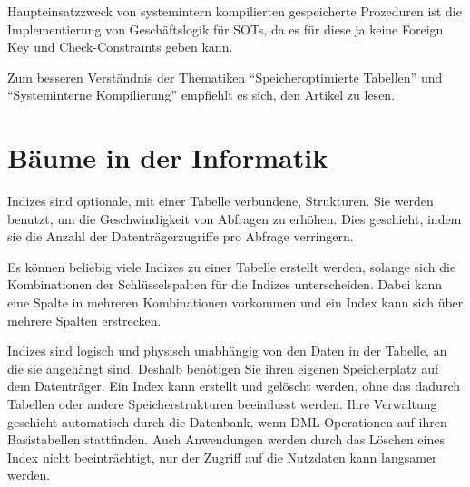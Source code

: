           Haupteinsatzzweck von systemintern kompilierten gespeicherte
          Prozeduren ist die Implementierung von Geschäftslogik für SOTs, da es
          für diese ja keine Foreign Key und Check-Constraints geben kann.
          \begin{merke}
            Zum besseren Verständnis der Thematiken \enquote{Speicheroptimierte
            Tabellen} und \enquote{Systeminterne Kompilierung} empfiehlt es
            sich, den Artikel \parencite{dn205319} zu lesen.
          \end{merke}
          \begin{literaturinternet}
            \item \cite{DynLinLib}
            \item \cite{KleKonSS2IMOAid}
            \item \cite{dn249342}
            \item \cite{dn205319}
          \end{literaturinternet}         
    \section{B\"aume in der Informatik}
      Indizes sind optionale, mit einer Tabelle verbundene, Strukturen.
      Sie werden benutzt, um die Geschwindigkeit von Abfragen zu erh\"ohen. Dies
      geschieht, indem sie die Anzahl der Datentr\"agerzugriffe pro Abfrage
      verringern.

      Es k\"onnen beliebig viele Indizes zu einer Tabelle erstellt werden,
      solange sich die Kombinationen der Schlüsselspalten f\"ur die Indizes
      unterscheiden. Dabei kann eine Spalte in mehreren Kombinationen vorkommen
      und ein Index kann sich \"uber mehrere Spalten erstrecken.

      Indizes sind logisch und physisch unabh\"angig von den Daten in der
      Tabelle, an die sie angeh\"angt sind. Deshalb ben\"otigen Sie ihren
      eigenen Speicherplatz auf dem Datentr\"ager. Ein Index kann erstellt und
      gel\"oscht werden, ohne das dadurch Tabellen oder andere
      Speicherstrukturen beeinflusst werden. Ihre Verwaltung geschieht
      automatisch durch die Datenbank, wenn DML-Operationen auf ihren
      Basistabellen stattfinden. Auch Anwendungen werden durch das L\"oschen
      eines Index nicht beeintr\"achtigt, nur der Zugriff auf die Nutzdaten kann
      langsamer werden.
      

